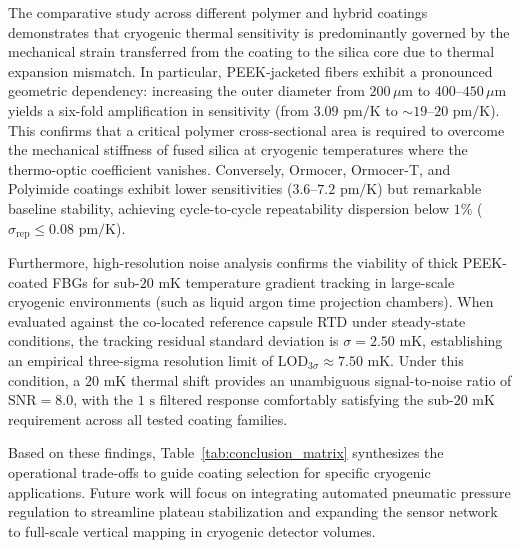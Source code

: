 \documentclass[12pt]{article}
\begin{document}
The comparative study across different polymer and hybrid coatings demonstrates that cryogenic thermal sensitivity is predominantly governed by the mechanical strain transferred from the coating to the silica core due to thermal expansion mismatch. In particular, PEEK-jacketed fibers exhibit a pronounced geometric dependency: increasing the outer diameter from $200\,\mu\text{m}$ to $400\text{--}450\,\mu\text{m}$ yields a six-fold amplification in sensitivity (from $3.09\text{ pm/K}$ to $\sim 19\text{--}20\text{ pm/K}$). This confirms that a critical polymer cross-sectional area is required to overcome the mechanical stiffness of fused silica at cryogenic temperatures where the thermo-optic coefficient vanishes. Conversely, Ormocer, Ormocer-T, and Polyimide coatings exhibit lower sensitivities ($3.6\text{--}7.2\text{ pm/K}$) but remarkable baseline stability, achieving cycle-to-cycle repeatability dispersion below $1\%$ ($\sigma_{\text{rep}} \le 0.08\text{ pm/K}$).

Furthermore, high-resolution noise analysis confirms the viability of thick PEEK-coated FBGs for sub-$20\text{ mK}$ temperature gradient tracking in large-scale cryogenic environments (such as liquid argon time projection chambers). When evaluated against the co-located reference capsule RTD under steady-state conditions, the tracking residual standard deviation is $\sigma = 2.50\text{ mK}$, establishing an empirical three-sigma resolution limit of $\text{LOD}_{3\sigma} \approx 7.50\text{ mK}$. Under this condition, a $20\text{ mK}$ thermal shift provides an unambiguous signal-to-noise ratio of $\text{SNR} = 8.0$, with the $1\text{ s}$ filtered response comfortably satisfying the sub-$20\text{ mK}$ requirement across all tested coating families.

Based on these findings, Table~\ref{tab:conclusion_matrix} synthesizes the operational trade-offs to guide coating selection for specific cryogenic applications. Future work will focus on integrating automated pneumatic pressure regulation to streamline plateau stabilization and expanding the sensor network to full-scale vertical mapping in cryogenic detector volumes.
\end{document}
